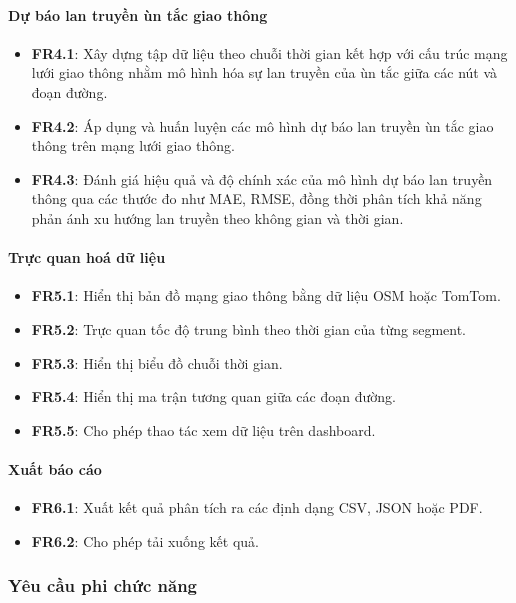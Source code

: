 \paragraph{Dự báo lan truyền ùn tắc giao thông}
\begin{itemize}
    \item \textbf{FR4.1}: Xây dựng tập dữ liệu theo chuỗi thời gian kết hợp với cấu trúc mạng lưới giao thông nhằm mô hình hóa sự lan truyền của ùn tắc giữa các nút và đoạn đường.
    \item \textbf{FR4.2}: Áp dụng và huấn luyện các mô hình dự báo lan truyền ùn tắc giao thông trên mạng lưới giao thông.
    \item \textbf{FR4.3}: Đánh giá hiệu quả và độ chính xác của mô hình dự báo lan truyền thông qua các thước đo như MAE, RMSE, đồng thời phân tích khả năng phản ánh xu hướng lan truyền theo không gian và thời gian.
\end{itemize}

\paragraph{Trực quan hoá dữ liệu}
\begin{itemize}
    \item \textbf{FR5.1}: Hiển thị bản đồ mạng giao thông bằng dữ liệu OSM hoặc TomTom.
    \item \textbf{FR5.2}: Trực quan tốc độ trung bình theo thời gian của từng segment.
    \item \textbf{FR5.3}: Hiển thị biểu đồ chuỗi thời gian.
    \item \textbf{FR5.4}: Hiển thị ma trận tương quan giữa các đoạn đường.
    \item \textbf{FR5.5}: Cho phép thao tác xem dữ liệu trên dashboard.
\end{itemize}

\paragraph{Xuất báo cáo}
\begin{itemize}
    \item \textbf{FR6.1}: Xuất kết quả phân tích ra các định dạng CSV, JSON hoặc PDF.
    \item \textbf{FR6.2}: Cho phép tải xuống kết quả.
\end{itemize}
\subsubsection{Yêu cầu phi chức năng}
